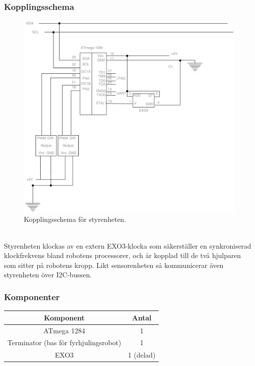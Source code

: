 \documentclass{article}
\begin{document}
\subsubsection{Kopplingsschema}
\begin{figure}[H]
\centering
\includegraphics[scale=0.45]{Styrenhet_kopplingsschema}
\caption{Kopplingsschema för styrenheten.}
\label{fig:styrenhet_kopplingsschema}
\end{figure}
\ \\
Styrenheten klockas av en extern EXO3-klocka som säkerställer en synkroniserad klockfrekvens bland robotens processorer, och är kopplad till de två hjulparen som sitter på robotens kropp. Likt sensorenheten så kommunicerar även styrenheten över I2C-bussen.

\subsubsection{Komponenter}

\begin{table}[H]
  \centering
  \begin{tabular}{ | c | c |}
    \hline
    \textbf{Komponent} & \textbf{Antal} \\
    \hline
    ATmega 1284 & 1 \\
    \hline
    Terminator (bas för fyrhjulingsrobot) & 1 \\
    \hline
    EXO3 & 1 (delad) \\
    \hline
  \end{tabular}
\end{table}
\end{document}

